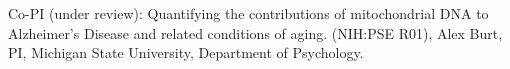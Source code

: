 

\item 
Co-PI (under review): Quantifying the contributions of mitochondrial DNA to Alzheimer's Disease and related conditions of aging. (NIH:PSE R01),
Alex Burt, PI, Michigan State University, Department of Psychology.  %

